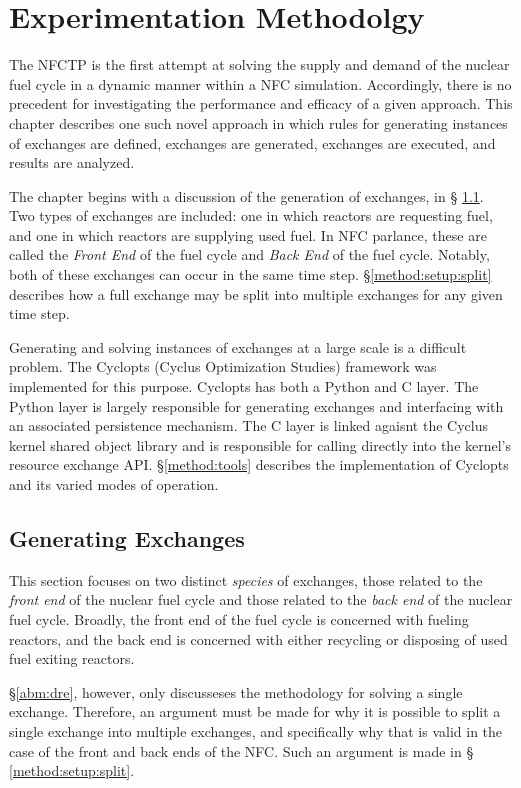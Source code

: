\chapter{Experimentation Methodolgy}\label{ch:method}

The NFCTP is the first attempt at solving the supply and demand of the nuclear
fuel cycle in a dynamic manner within a NFC simulation. Accordingly, there is no
precedent for investigating the performance and efficacy of a given
approach. This chapter describes one such novel approach in which rules for
generating instances of exchanges are defined, exchanges are generated,
exchanges are executed, and results are analyzed. 

The chapter begins with a discussion of the generation of exchanges, in \S
\ref{method:setup}. Two types of exchanges are included: one in which reactors
are requesting fuel, and one in which reactors are supplying used fuel. In NFC
parlance, these are called the \textit{Front End} of the fuel cycle and
\textit{Back End} of the fuel cycle. Notably, both of these exchanges can occur
in the same time step. \S \ref{method:setup:split} describes how a full exchange
may be split into multiple exchanges for any given time step. 

Generating and solving instances of exchanges at a large scale is a difficult
problem. The Cyclopts (Cyclus Optimization Studies) framework was implemented
for this purpose. Cyclopts has both a Python and C layer. The Python layer is
largely responsible for generating exchanges and interfacing with an associated
persistence mechanism. The C layer is linked agaisnt the Cyclus kernel shared
object library and is responsible for calling directly into the kernel's
resource exchange API. \S \ref{method:tools} describes the implementation of
Cyclopts and its varied modes of operation. 

\section{Generating Exchanges}\label{method:setup}

This section focuses on two distinct \textit{species} of exchanges, those
related to the \textit{front end} of the nuclear fuel cycle and those related to
the \textit{back end} of the nuclear fuel cycle. Broadly, the front end of the
fuel cycle is concerned with fueling reactors, and the back end is concerned
with either recycling or disposing of used fuel exiting reactors. 

\S \ref{abm:dre}, however, only discusseses the methodology for solving a single
exchange. Therefore, an argument must be made for why it is possible to split a
single exchange into multiple exchanges, and specifically why that is valid in
the case of the front and back ends of the NFC. Such an argument is made in \S
\ref{method:setup:split}.

